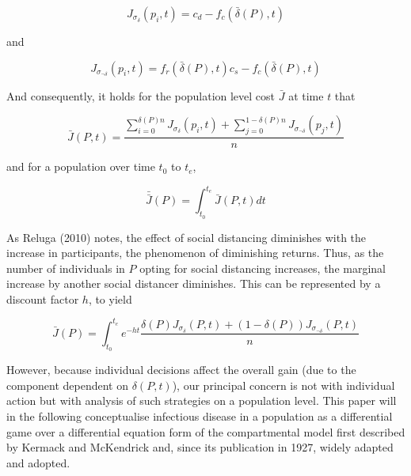 \documentclass{article}
\begin{document}
\begin{equation}
	J_{\sigma_{\delta}}(p_i, t) = c_d - f_c(\bar{\delta}(P), t)
\end{equation}

\noindent and

\begin{equation}
	J_{\sigma_{\lnot \delta}}(p_i, t) = f_r(\bar{\delta}(P), t) c_s - f_c(\bar{\delta}(P), t)
	\label{eq:risk}
\end{equation}

\noindent And consequently, it holds for the population level cost $\bar{J}$ at time $t$ that

\begin{equation}
	\bar{J}(P, t) = \frac{\displaystyle \sum_{i=0}^{\delta(P) n} J_{\sigma_{\delta}}(p_i, t) + \displaystyle \sum_{j=0}^{1-\delta(P) n} J_{\sigma_{\lnot \delta}}(p_j, t)}{n}
	\label{eq:cost_eqn}
\end{equation}

\noindent and for a population over time $t_0$ to $t_e$, 

\begin{equation}
	\bar{\bar{J}}(P) = \int_{t_0}^{t_e} \bar{J}(P, t) dt
\end{equation}

As Reluga (2010) notes, the effect of social distancing diminishes with the increase in participants, the phenomenon of diminishing returns.\cite{reluga2010game} Thus, as the number of individuals in $P$ opting for social distancing increases, the marginal increase by another social distancer diminishes. This can be represented by a discount factor $h$, to yield

\begin{equation}
	\bar{J}(P) = \int_{t_0}^{t_e} e^{-ht} \frac{\delta(P) J_{\sigma_{\delta}}(P, t) + (1 - \delta(P)) J_{\sigma_{\lnot \delta}}(P, t)}{n}
\end{equation}

However, because individual decisions affect the overall gain (due to the component dependent on $\delta(P, t)$), our principal concern is not with individual action but with analysis of such strategies on a population level. This paper will in the following conceptualise infectious disease in a population as a differential game over a differential equation form of the compartmental model first described by Kermack and McKendrick\cite{kermack1927contribution} and, since its publication in 1927, widely adapted and adopted.\cite{vstvepan2007kermack,roberts1999kermack,capasso1978generalization}
\end{document}
